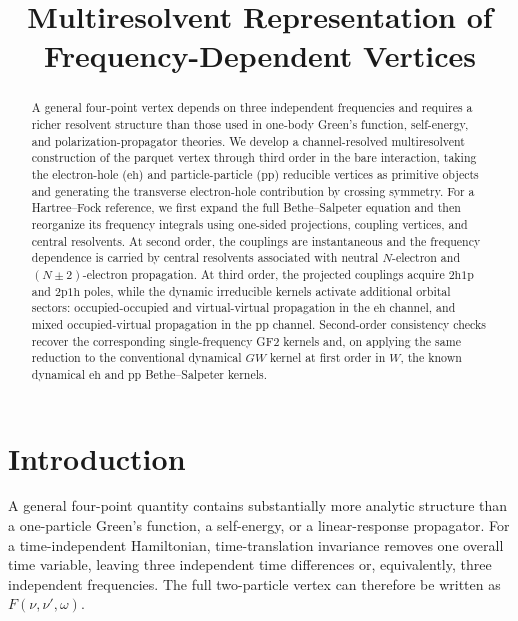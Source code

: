 \documentclass[aip,jcp,reprint,noshowkeys,superscriptaddress]{revtex4-1}
\newcommand{\hhp}{\text{2h1p}}
\newcommand{\pph}{\text{2p1h}}
\newcommand{\eh}{\text{eh}}
\newcommand{\pp}{\text{pp}}
\newcommand{\LCPQ}{Laboratoire de Chimie et Physique Quantiques (UMR 5626), Universit\'e de Toulouse, CNRS, UPS, France}
\begin{document}
\title{Multiresolvent Representation of Frequency-Dependent Vertices}


\begin{abstract}
A general four-point vertex depends on three independent frequencies and requires a richer resolvent structure than those used in one-body Green's function, self-energy, and polarization-propagator theories.
We develop a channel-resolved multiresolvent construction of the parquet vertex through third order in the bare interaction, taking the electron-hole ($\eh$) and particle-particle ($\pp$) reducible vertices as primitive objects and generating the transverse electron-hole contribution by crossing symmetry.
For a Hartree--Fock reference, we first expand the full Bethe--Salpeter equation and then reorganize its frequency integrals using one-sided projections, coupling vertices, and central resolvents.
At second order, the couplings are instantaneous and the frequency dependence is carried by central resolvents associated with neutral $N$-electron and $(N\pm2)$-electron propagation.
At third order, the projected couplings acquire $\hhp$ and $\pph$ poles, while the dynamic irreducible kernels activate additional orbital sectors: occupied-occupied and virtual-virtual propagation in the $\eh$ channel, and mixed occupied-virtual propagation in the $\pp$ channel.
Second-order consistency checks recover the corresponding single-frequency GF2 kernels and, on applying the same reduction to the conventional dynamical $GW$ kernel at first order in $W$, the known dynamical $\eh$ and $\pp$ Bethe--Salpeter kernels.
\end{abstract}

\maketitle


\section{Introduction}
\label{sec:introduction}

A general four-point quantity contains substantially more analytic
structure than a one-particle Green's function, a self-energy, 
or a linear-response propagator.
For a time-independent Hamiltonian, time-translation invariance removes
one overall time variable, leaving three independent time differences or,
equivalently, three independent frequencies.
The full two-particle vertex can therefore be written as
$F(\nu,\nu',\omega)$.\cite{StarkeKresse2012}
\end{document}
